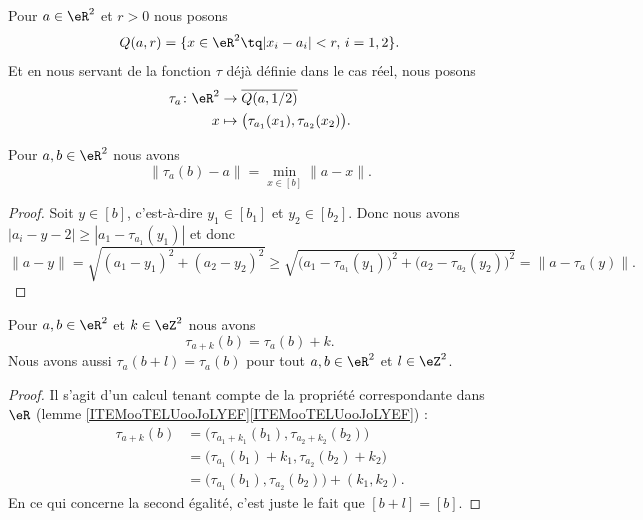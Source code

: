 \begin{definition}	\label{DEFooJNJQooThnhle}
	Pour \( a\in \eR^2\) et \( r>0\) nous posons
	\begin{equation}
		Q(a,r)=\{ x\in \eR^2\tq | x_i-a_i |<r,\,i=1,2 \}.
	\end{equation}
	Et en nous servant de la fonction \( \tau\) déjà définie dans le cas réel, nous posons
	\begin{equation}
		\begin{aligned}
			\tau_a\colon \eR^2 & \to \overline{Q(a,1/2)}                              \\
			x                  & \mapsto \big( \tau_{a_1}(x_1),\tau_{a_2}(x_2) \big).
		\end{aligned}
	\end{equation}
\end{definition}

\begin{lemma}	\label{LEMooWYCAooYVhcoD}
	Pour \( a,b\in \eR^2\) nous avons
	\begin{equation}
		\| \tau_a(b)-a \|=\min_{x\in[b]}\| a-x \|.
	\end{equation}
\end{lemma}

\begin{proof}
	Soit \( y\in [b]\), c'est-à-dire \( y_1\in[b_1]\) et \( y_2\in [b_2]\). Donc nous avons \( | a_i-y-2 |\geq | a_1-\tau_{a_1}(y_1) |\) et donc
	\begin{equation}
		\| a-y \|=\sqrt{ (a_1-y_1)^2+(a_2-y_2)^2 }\geq \sqrt{\big( a_1-\tau_{a_1}(y_1) \big)^2+\big( a_2-\tau_{a_2}(y_2) \big)^2}=\| a-\tau_a(y) \|.
	\end{equation}
\end{proof}

\begin{lemma}	\label{LEMooTDKOooXBbqzK}
	Pour \( a,b\in \eR^2\) et \( k\in \eZ^2\) nous avons
	\begin{equation}
		\tau_{a+k}(b)=\tau_a(b)+k.
	\end{equation}
	Nous avons aussi \( \tau_a(b+l)=\tau_a(b)\) pour tout \( a,b\in \eR^2\) et \( l\in \eZ^2\).
\end{lemma}

\begin{proof}
	Il s'agit d'un calcul tenant compte de la propriété correspondante dans \( \eR\) (lemme \ref{ITEMooTELUooJoLYEF}\ref{ITEMooTELUooJoLYEF}) :
	\begin{subequations}
		\begin{align}
			\tau_{a+k}(b) & =\big( \tau_{a_1+k_1}(b_1),\tau_{a_2+k_2}(b_2) \big)    \\
			              & =\big( \tau_{a_1}(b_1)+k_1,\tau_{a_2}(b_2)+k_2 \big)    \\
			              & =\big( \tau_{a_1}(b_1),\tau_{a_2}(b_2) \big)+(k_1,k_2).
		\end{align}
	\end{subequations}
	En ce qui concerne la second égalité, c'est juste le fait que \( [b+l]=[b]\).
\end{proof}


